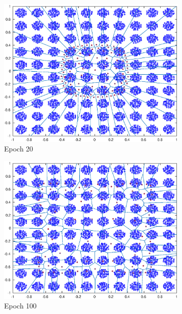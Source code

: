 \documentclass[10pt]{article}
\begin{document}
\begin{figure}[H]
  \caption{Batch Neural Gas results on epochs 20, 100, 200 and 500}
  \centering
  \begin{subfigure}[b]{.45\textwidth}
    \includegraphics[width=\columnwidth]{NeuralGas_20.eps}
    \caption{Epoch 20}
  \end{subfigure}
  \quad
  \begin{subfigure}[b]{.45\textwidth}
    \includegraphics[width=\columnwidth]{NeuralGas_100}
    \caption{Epoch 100}
  \end{subfigure}
  \quad
  \begin{subfigure}[b]{.45\textwidth}

\end{subfigure}
\end{figure}
\end{document}
